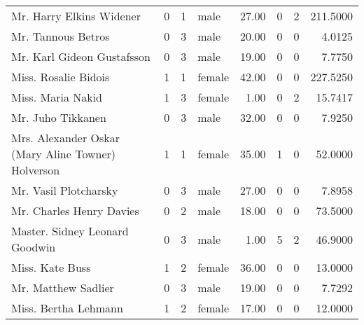 \begin{tabular}{lrrlrrrr}
Mr. Harry Elkins Widener                           &         0 &       1 &    male &  27.00 &                        0 &                        2 &  211.5000 \\
Mr. Tannous Betros                                 &         0 &       3 &    male &  20.00 &                        0 &                        0 &    4.0125 \\
Mr. Karl Gideon Gustafsson                         &         0 &       3 &    male &  19.00 &                        0 &                        0 &    7.7750 \\
Miss. Rosalie Bidois                               &         1 &       1 &  female &  42.00 &                        0 &                        0 &  227.5250 \\
Miss. Maria Nakid                                  &         1 &       3 &  female &   1.00 &                        0 &                        2 &   15.7417 \\
Mr. Juho Tikkanen                                  &         0 &       3 &    male &  32.00 &                        0 &                        0 &    7.9250 \\
Mrs. Alexander Oskar (Mary Aline Towner) Holverson &         1 &       1 &  female &  35.00 &                        1 &                        0 &   52.0000 \\
Mr. Vasil Plotcharsky                              &         0 &       3 &    male &  27.00 &                        0 &                        0 &    7.8958 \\
Mr. Charles Henry Davies                           &         0 &       2 &    male &  18.00 &                        0 &                        0 &   73.5000 \\
Master. Sidney Leonard Goodwin                     &         0 &       3 &    male &   1.00 &                        5 &                        2 &   46.9000 \\
Miss. Kate Buss                                    &         1 &       2 &  female &  36.00 &                        0 &                        0 &   13.0000 \\
Mr. Matthew Sadlier                                &         0 &       3 &    male &  19.00 &                        0 &                        0 &    7.7292 \\
Miss. Bertha Lehmann                               &         1 &       2 &  female &  17.00 &                        0 &                        0 &   12.0000 \\

\end{tabular}
